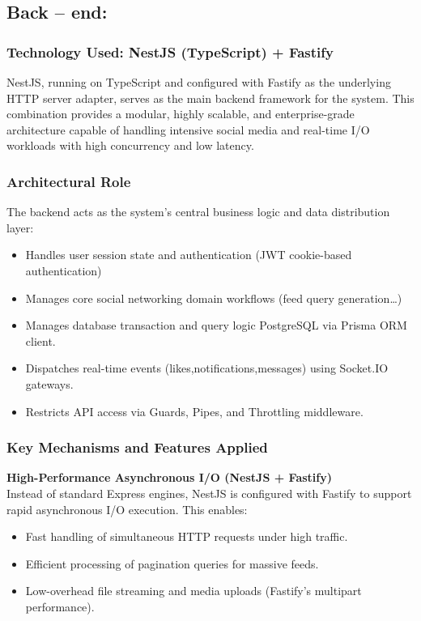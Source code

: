 \subsection{Back -- end:}

\subsubsection{Technology Used: NestJS (TypeScript) + Fastify}

NestJS, running on TypeScript and configured with Fastify as the underlying HTTP server adapter, serves as the main backend framework for the system. This combination provides a modular, highly scalable, and enterprise-grade architecture capable of handling intensive social media and real-time I/O workloads with high concurrency and low latency.

\subsubsection{Architectural Role}

The backend acts as the system's central business logic and data distribution layer:
\begin{itemize}
  \item Handles user session state and authentication (JWT cookie-based authentication)
  \item Manages core social networking domain workflows (feed query generation{\ldots})
  \item Manages database transaction and query logic PostgreSQL via Prisma ORM client.
  \item Dispatches real-time events (likes,notifications,messages) using Socket.IO gateways.
  \item Restricts API access via Guards, Pipes, and Throttling middleware.
\end{itemize}

\subsubsection{Key Mechanisms and Features Applied}

\medskip\noindent\textbf{High-Performance Asynchronous I/O (NestJS + Fastify)}\\[2pt]

Instead of standard Express engines, NestJS is configured with Fastify to support rapid asynchronous I/O execution. This enables:
\begin{itemize}
  \item Fast handling of simultaneous HTTP requests under high traffic.
  \item Efficient processing of pagination queries for massive feeds.
  \item Low-overhead file streaming and media uploads (Fastify's multipart performance).
\end{itemize}


